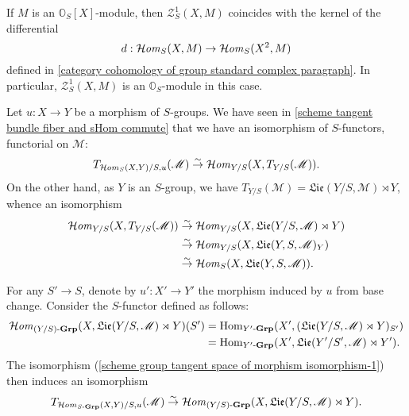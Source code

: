 \begin{remark}
If $M$ is an $\mathbb{O}_S[X]$-module, then $\mathcal{Z}_S^1(X,M)$ coincides with the kernel of the differential
\[d:\operatorname{\mathcal{H}\hspace*{-0.4pt}\textit{om}\hspace{0.5pt}}_S(X,M)\to\operatorname{\mathcal{H}\hspace*{-0.4pt}\textit{om}\hspace{0.5pt}}_S(X^2,M)\]
defined in \ref{category cohomology of group standard complex paragraph}. In particular, $\mathcal{Z}_S^1(X,M)$ is an $\mathbb{O}_S$-module in this case.
\end{remark}

Let $u:X\to Y$ be a morphism of $S$-groups. We have seen in \cref{scheme tangent bundle fiber and sHom commute} that we have an isomorphism of $S$-functors, functorial on $\mathscr{M}$:
\begin{equation}\label{scheme group tangent space of morphism isomorphism-1}
T_{\operatorname{\mathcal{H}\hspace*{-0.4pt}\textit{om}\hspace{0.5pt}}_{S}(X,Y)/S,u}(\mathscr{M})\stackrel{\sim}{\to} \operatorname{\mathcal{H}\hspace*{-0.4pt}\textit{om}\hspace{0.5pt}}_{Y/S}(X,T_{Y/S}(\mathscr{M})).
\end{equation}
On the other hand, as $Y$ is an $S$-group, we have $T_{Y/S}(\mathscr{M})=\mathfrak{Lie}(Y/S,\mathscr{M})\rtimes Y$, whence an isomorphism
\begin{equation}\label{scheme group tangent space of morphism isomorphism-2}
\begin{aligned}
\operatorname{\mathcal{H}\hspace*{-0.4pt}\textit{om}\hspace{0.5pt}}_{Y/S}(X,T_{Y/S}(\mathscr{M}))&\stackrel{\sim}{\to}\operatorname{\mathcal{H}\hspace*{-0.4pt}\textit{om}\hspace{0.5pt}}_{Y/S}(X,\mathfrak{Lie}(Y/S,\mathscr{M})\rtimes Y)\\
&\stackrel{\sim}{\to}\operatorname{\mathcal{H}\hspace*{-0.4pt}\textit{om}\hspace{0.5pt}}_{Y/S}(X,\mathfrak{Lie}(Y,S,\mathscr{M})_Y)\\
&\stackrel{\sim}{\to}\operatorname{\mathcal{H}\hspace*{-0.4pt}\textit{om}\hspace{0.5pt}}_S(X,\mathfrak{Lie}(Y,S,\mathscr{M})).
\end{aligned}
\end{equation}

For any $S'\to S$, denote by $u':X'\to Y'$ the morphism induced by $u$ from base change. Consider the $S$-functor defined as follows:
\begin{align*}
\operatorname{\mathcal{H}\hspace*{-0.4pt}\textit{om}\hspace{0.5pt}}_{(Y/S)\textup{-}\mathbf{Grp}}(X,\mathfrak{Lie}(Y/S,\mathscr{M})\rtimes Y)(S')&=\mathrm{Hom}_{Y'\textup{-}\mathbf{Grp}}(X',(\mathfrak{Lie}(Y/S,\mathscr{M})\rtimes Y)_{S'})\\
&=\mathrm{Hom}_{Y'\textup{-}\mathbf{Grp}}(X',\mathfrak{Lie}(Y'/S',\mathscr{M})\rtimes Y').
\end{align*}
The isomorphism (\ref{scheme group tangent space of morphism isomorphism-1}) then induces an isomorphism
\begin{equation}\label{scheme group tangent space of morphism isomorphism-3}
T_{\operatorname{\mathcal{H}\hspace*{-0.4pt}\textit{om}\hspace{0.5pt}}_{S\textup{-}\mathbf{Grp}}(X,Y)/S,u}(\mathscr{M})\stackrel{\sim}{\to} \operatorname{\mathcal{H}\hspace*{-0.4pt}\textit{om}\hspace{0.5pt}}_{(Y/S)\textup{-}\mathbf{Grp}}(X,\mathfrak{Lie}(Y/S,\mathscr{M})\rtimes Y).
\end{equation}


